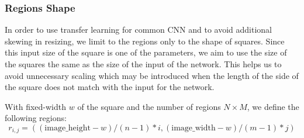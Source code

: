 





\subsubsection{Regions Shape}

In order to use transfer learning for common CNN and to avoid additional skewing in resizing, we limit to the regions only to the shape of squares. Since this input size of the square is one of the parameters, we aim to use the size of the squares the same as the size of the input of the network. This helps us to avoid unnecessary scaling which may be introduced when the length of the side of the square does not match with the input for the network.

With fixed-width $w$ of the square and the number of regions $N \times M$, we define the following regions:
\[ 
r_{i,j} = {(( \text{image\_height} - w) / (n - 1) *i, ( \text{image\_width} - w) / (m - 1) * j)}
\]


